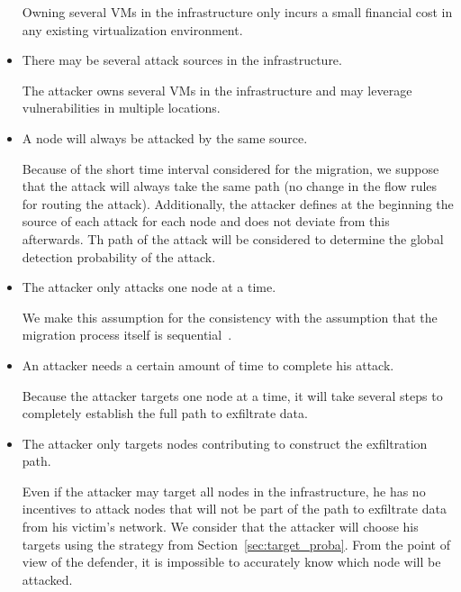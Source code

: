 \begin{itemize}
     Owning several VMs in the infrastructure only incurs a small financial cost in any existing virtualization environment.
 
    
    \item There may be several attack sources in the infrastructure.
    
    The attacker owns several VMs in the infrastructure and may leverage vulnerabilities in multiple locations.
    
    \item A node will always be attacked by the same source.
    
    Because of the short time interval considered for the migration, we suppose that the attack will always take the same path (\ie no change in the flow rules for routing the attack).
    Additionally, the attacker defines at the beginning the source of each attack for each node and does not deviate from this afterwards.
    Th path of the attack will be considered to determine the global detection probability of the attack.
    
    \item The attacker only attacks one node at a time.
    
    We make this assumption for the consistency with the assumption that the migration process itself is sequential~\cite{Lime-Ghorbani2014}.
    
    
    \item An attacker needs a certain amount of time to complete his attack.
    
    Because the attacker targets one node at a time, it will take several steps to completely establish the full path to exfiltrate data. 
    
    \item The attacker only targets nodes contributing to construct the exfiltration path.
    
     Even if the attacker may target all nodes in the infrastructure, he has no incentives to attack nodes that will not be part of the path to exfiltrate data from his victim's network. We consider that the attacker will choose his targets using the strategy from Section~\ref{sec:target_proba}.
    From the point of view of the defender, it is impossible to accurately know which node will be attacked.
    
\end{itemize}




